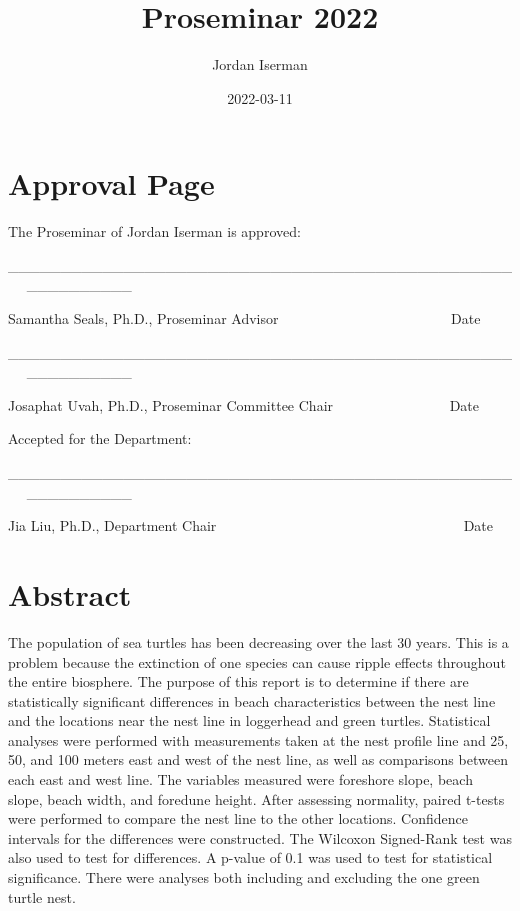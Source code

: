 \documentclass[
]{article}
\title{Proseminar 2022}
\author{Jordan Iserman}
\date{2022-03-11}
\begin{document}
\maketitle

{
\setcounter{tocdepth}{2}
\tableofcontents
}
\hypertarget{approval-page}{%
\section*{Approval Page}\label{approval-page}}

The Proseminar of Jordan Iserman is approved:

\_\_\_\_\_\_\_\_\_\_\_\_\_\_\_\_\_\_\_\_\_\_\_\_\_\_\_\_\_\_\_\_\_\_\_\_\_\_\_\_\_\_\_\_\_\_\_\_   \_\_\_\_\_\_\_\_\_\_

Samantha Seals, Ph.D., Proseminar Advisor                   Date

\_\_\_\_\_\_\_\_\_\_\_\_\_\_\_\_\_\_\_\_\_\_\_\_\_\_\_\_\_\_\_\_\_\_\_\_\_\_\_\_\_\_\_\_\_\_\_\_   \_\_\_\_\_\_\_\_\_\_

Josaphat Uvah, Ph.D., Proseminar Committee Chair             Date

Accepted for the Department:

\_\_\_\_\_\_\_\_\_\_\_\_\_\_\_\_\_\_\_\_\_\_\_\_\_\_\_\_\_\_\_\_\_\_\_\_\_\_\_\_\_\_\_\_\_\_\_\_   \_\_\_\_\_\_\_\_\_\_

Jia Liu, Ph.D., Department Chair                           Date

\hypertarget{abstract}{%
\section*{Abstract}\label{abstract}}

The population of sea turtles has been decreasing over the last 30 years. This is a problem because the extinction of one species can cause ripple effects throughout the entire biosphere. The purpose of this report is to determine if there are statistically significant differences in beach characteristics between the nest line and the locations near the nest line in loggerhead and green turtles. Statistical analyses were performed with measurements taken at the nest profile line and 25, 50, and 100 meters east and west of the nest line, as well as comparisons between each east and west line. The variables measured were foreshore slope, beach slope, beach width, and foredune height. After assessing normality, paired t-tests were performed to compare the nest line to the other locations. Confidence intervals for the differences were constructed. The Wilcoxon Signed-Rank test was also used to test for differences. A p-value of 0.1 was used to test for statistical significance. There were analyses both including and excluding the one green turtle nest.
\end{document}
